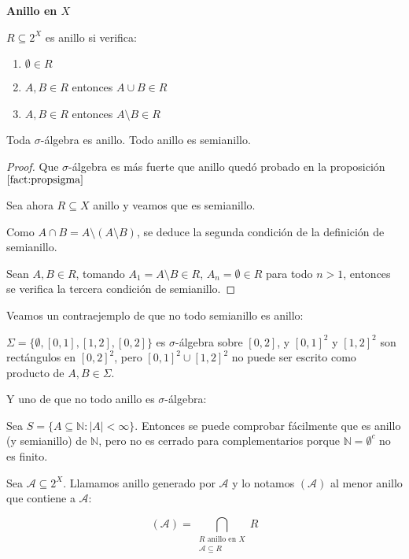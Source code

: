 \begin{definition} \textbf{Anillo en $X$}

 $R\subseteq 2^X$ es anillo si verifica:
 
 \begin{enumerate}[i]
  \item $\emptyset \in R$
  \item $A,B \in R$ entonces $A\cup B \in R$
  \item $A,B \in R$ entonces $A\setminus B \in R$
 \end{enumerate}
\end{definition}


\begin{fact}
 Toda $\sigma$-álgebra es anillo. Todo anillo es semianillo.
\end{fact}

\begin{proof}
 Que $\sigma$-álgebra es más fuerte que anillo quedó probado en la proposición $\ref{fact:propsigma}$
 
 Sea ahora $R \subseteq X$ anillo y veamos que es semianillo.

 Como $A\cap B = A\setminus (A\setminus B)$, se deduce la segunda condición de la definición de semianillo.
 
 Sean $A, B \in R$, tomando $A_1 = A\setminus B \in R$, $A_n = \emptyset \in R$ para todo $n > 1$, entonces se 
 verifica la tercera condición de semianillo.
\end{proof}

\begin{counterex}
 Veamos un contraejemplo de que no todo semianillo es anillo:
 
 $\Sigma = \{\emptyset, [0,1], [1,2], [0,2]\}$ es $\sigma$-álgebra sobre $[0,2]$, y $[0,1]^2$ y $[1,2]^2$ son rectángulos
 en $[0,2]^2$, pero $[0,1]^2 \cup [1,2]^2$ no puede ser escrito como producto de $A,B \in \Sigma$.
 
 Y uno de que no todo anillo es $\sigma$-álgebra:
 
 Sea $S = \{A\subseteq \mathbb{N}: |A| < \infty\}$. Entonces se puede comprobar fácilmente que es anillo (y semianillo)
 de $\mathbb{N}$, pero no es cerrado para complementarios porque $\mathbb{N} = \emptyset^c$ no es finito.
\end{counterex}


\begin{definition}
 Sea $\mathcal{A} \subseteq 2^X$. Llamamos anillo generado por $\mathcal{A}$ y lo notamos $(\mathcal{A})$ al
 menor anillo que contiene a $\mathcal{A}$:
 
 \[(\mathcal{A}) = \bigcap_{\begin{array}{c}R \textrm{ anillo en } X\\ \mathcal{A}\subseteq R \end{array}} R\]
\end{definition}

